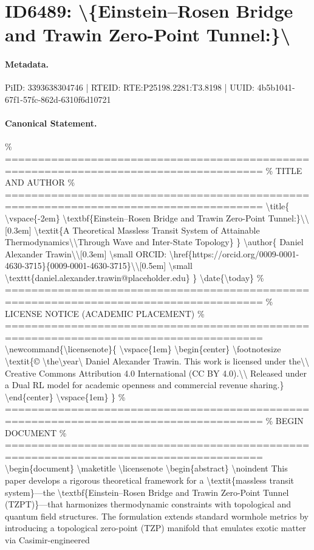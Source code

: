 \section*{ID6489: \textbackslash{}\{Einstein–Rosen Bridge and Trawin Zero-Point Tunnel:\}\textbackslash{}}
\paragraph{Metadata.}
PiID: 3393638304746 | RTEID: RTE:P25198.2281:T3.8198 | UUID: 4b5b1041-67f1-57fc-862d-6310f6d10721

\paragraph{Canonical Statement.}
\% ===================================================================================== \% TITLE AND AUTHOR \% ===================================================================================== \textbackslash{}title\{ \textbackslash{}vspace\{-2em\} \textbackslash{}textbf\{Einstein–Rosen Bridge and Trawin Zero-Point Tunnel:\}\textbackslash{}\textbackslash{}[0.3em] \textbackslash{}textit\{A Theoretical Massless Transit System of Attainable Thermodynamics\textbackslash{}\textbackslash{}Through Wave and Inter-State Topology\} \} \textbackslash{}author\{ Daniel Alexander Trawin\textbackslash{}\textbackslash{}[0.3em] \textbackslash{}small ORCID: \textbackslash{}href\{https://orcid.org/0009-0001-4630-3715\}\{0009-0001-4630-3715\}\textbackslash{}\textbackslash{}[0.5em] \textbackslash{}small \textbackslash{}texttt\{daniel.alexander.trawin@placeholder.edu\} \} \textbackslash{}date\{\textbackslash{}today\} \% ===================================================================================== \% LICENSE NOTICE (ACADEMIC PLACEMENT) \% ===================================================================================== \textbackslash{}newcommand\{\textbackslash{}licensenote\}\{ \textbackslash{}vspace\{1em\} \textbackslash{}begin\{center\} \textbackslash{}footnotesize \textbackslash{}textit\{© \textbackslash{}the\textbackslash{}year\textbackslash{} Daniel Alexander Trawin. This work is licensed under the\textbackslash{}\textbackslash{} Creative Commons Attribution 4.0 International (CC BY 4.0).\textbackslash{}\textbackslash{} Released under a Dual RL model for academic openness and commercial revenue sharing.\} \textbackslash{}end\{center\} \textbackslash{}vspace\{1em\} \} \% ===================================================================================== \% BEGIN DOCUMENT \% ===================================================================================== \textbackslash{}begin\{document\} \textbackslash{}maketitle \textbackslash{}licensenote \textbackslash{}begin\{abstract\} \textbackslash{}noindent This paper develops a rigorous theoretical framework for a \textbackslash{}textit\{massless transit system\}—the \textbackslash{}textbf\{Einstein–Rosen Bridge and Trawin Zero-Point Tunnel (TZPT)\}—that harmonizes thermodynamic constraints with topological and quantum field structures. The formulation extends standard wormhole metrics by introducing a topological zero-point (TZP) manifold that emulates exotic matter via Casimir-engineered 